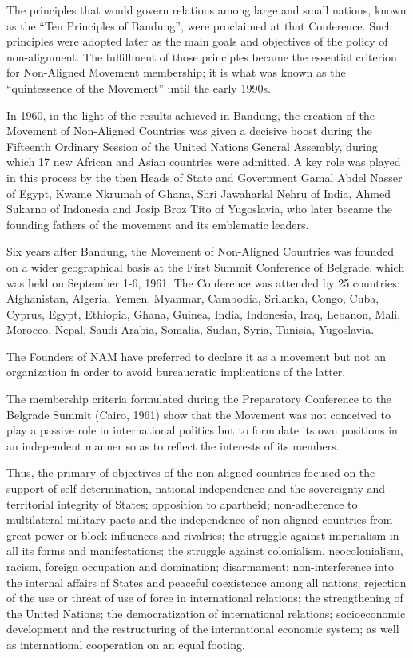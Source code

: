 \documentclass[
  openany]{book}
\begin{document}
The principles that would govern relations among large and small nations, known as the ``Ten Principles of Bandung'', were proclaimed at that Conference. Such principles were adopted later as the main goals and objectives of the policy of non-alignment. The fulfillment of those principles became the essential criterion for Non-Aligned Movement membership; it is what was known as the ``quintessence of the Movement'' until the early 1990s.

In 1960, in the light of the results achieved in Bandung, the creation of the Movement of Non-Aligned Countries was given a decisive boost during the Fifteenth Ordinary Session of the United Nations General Assembly, during which 17 new African and Asian countries were admitted. A key role was played in this process by the then Heads of State and Government Gamal Abdel Nasser of Egypt, Kwame Nkrumah of Ghana, Shri Jawaharlal Nehru of India, Ahmed Sukarno of Indonesia and Josip Broz Tito of Yugoslavia, who later became the founding fathers of the movement and its emblematic leaders.

Six years after Bandung, the Movement of Non-Aligned Countries was founded on a wider geographical basis at the First Summit Conference of Belgrade, which was held on September 1-6, 1961. The Conference was attended by 25 countries: Afghanistan, Algeria, Yemen, Myanmar, Cambodia, Srilanka, Congo, Cuba, Cyprus, Egypt, Ethiopia, Ghana, Guinea, India, Indonesia, Iraq, Lebanon, Mali, Morocco, Nepal, Saudi Arabia, Somalia, Sudan, Syria, Tunisia, Yugoslavia.

The Founders of NAM have preferred to declare it as a movement but not an organization in order to avoid bureaucratic implications of the latter.

The membership criteria formulated during the Preparatory Conference to the Belgrade Summit (Cairo, 1961) show that the Movement was not conceived to play a passive role in international politics but to formulate its own positions in an independent manner so as to reflect the interests of its members.

Thus, the primary of objectives of the non-aligned countries focused on the support of self-determination, national independence and the sovereignty and territorial integrity of States; opposition to apartheid; non-adherence to multilateral military pacts and the independence of non-aligned countries from great power or block influences and rivalries; the struggle against imperialism in all its forms and manifestations; the struggle against colonialism, neocolonialism, racism, foreign occupation and domination; disarmament; non-interference into the internal affairs of States and peaceful coexistence among all nations; rejection of the use or threat of use of force in international relations; the strengthening of the United Nations; the democratization of international relations; socioeconomic development and the restructuring of the international economic system; as well as international cooperation on an equal footing.
\end{document}
